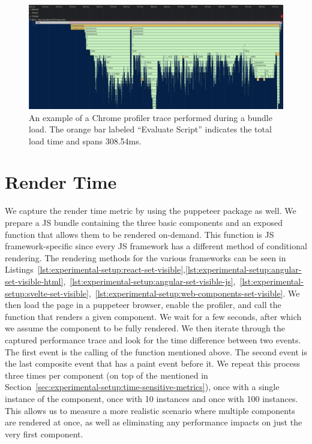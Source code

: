 \begin{figure}[h]
  \includegraphics[width=\columnwidth]{figures/experimental-setup/load-time.png}
  \caption{An example of a Chrome profiler trace performed during a bundle load. The orange bar labeled ``Evaluate Script'' indicates the total load time and spans 308.54ms.}
  \label{fig:experimental-setup:load-time}
  \centering
\end{figure}

\section{Render Time}
We capture the render time metric by using the puppeteer package as well. We prepare a JS bundle containing the three basic components and an exposed function that allows them to be rendered on-demand. This function is JS framework-specific since every JS framework has a different method of conditional rendering. The rendering methods for the various frameworks can be seen in Listings~\ref{lst:experimental-setup:react-set-visible},\ref{lst:experimental-setup:angular-set-visible-html},~\ref{lst:experimental-setup:angular-set-visible-js},~\ref{lst:experimental-setup:svelte-set-visible},~\ref{lst:experimental-setup:web-components-set-visible}. We then load the page in a puppeteer browser, enable the profiler, and call the function that renders a given component. We wait for a few seconds, after which we assume the component to be fully rendered. We then iterate through the captured performance trace and look for the time difference between two events. The first event is the calling of the function mentioned above. The second event is the last composite event that has a paint event before it. We repeat this process three times per component (on top of the \numMeasures{} mentioned in Section~\ref{sec:experimental-setup:time-sensitive-metrics}), once with a single instance of the component, once with 10 instances and once with 100 instances. This allows us to measure a more realistic scenario where multiple components are rendered at once, as well as eliminating any performance impacts on just the very first component.

